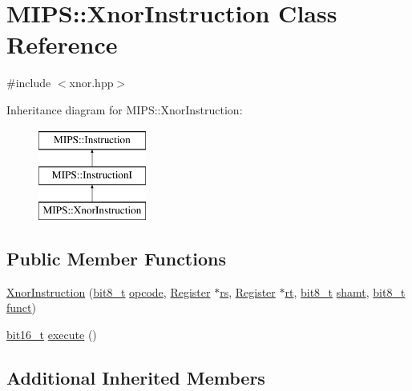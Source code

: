\hypertarget{classMIPS_1_1XnorInstruction}{}\section{M\+I\+PS\+:\+:Xnor\+Instruction Class Reference}
\label{classMIPS_1_1XnorInstruction}


{\ttfamily \#include $<$xnor.\+hpp$>$}

Inheritance diagram for M\+I\+PS\+:\+:Xnor\+Instruction\+:\begin{figure}[H]
\begin{center}
\leavevmode
\includegraphics[height=3.000000cm]{classMIPS_1_1XnorInstruction}
\end{center}
\end{figure}
\subsection*{Public Member Functions}
\begin{DoxyCompactItemize}
\item 
\hyperlink{classMIPS_1_1XnorInstruction_aa6ace56cbc1f0a87f0661ecf5925bc2d}{Xnor\+Instruction} (\hyperlink{core_8hpp_a6074bae122ae7b527864eec42c728c3c}{bit8\+\_\+t} \hyperlink{classMIPS_1_1Instruction_a45cc6808b5dde8a5d41067d148b55476}{opcode}, \hyperlink{classMIPS_1_1Register}{Register} $\ast$\hyperlink{classMIPS_1_1InstructionI_a2be191d5b3dce505e2e626ec02eb4d62}{rs}, \hyperlink{classMIPS_1_1Register}{Register} $\ast$\hyperlink{classMIPS_1_1InstructionI_add1db07a5c954f35271de8c8a5737487}{rt}, \hyperlink{core_8hpp_a6074bae122ae7b527864eec42c728c3c}{bit8\+\_\+t} \hyperlink{classMIPS_1_1InstructionI_aa9b6da37c374c2ec8d96448d341e5e7d}{shamt}, \hyperlink{core_8hpp_a6074bae122ae7b527864eec42c728c3c}{bit8\+\_\+t} \hyperlink{classMIPS_1_1InstructionI_a5c6efcbbd233a7447c1fe24ea0a1e558}{funct})
\item 
\hyperlink{core_8hpp_adc265a970bc35995b5879784bbb3f1b7}{bit16\+\_\+t} \hyperlink{classMIPS_1_1XnorInstruction_a4b5ae9a875883902c0ed1e237e753f31}{execute} ()
\end{DoxyCompactItemize}
\subsection*{Additional Inherited Members}


